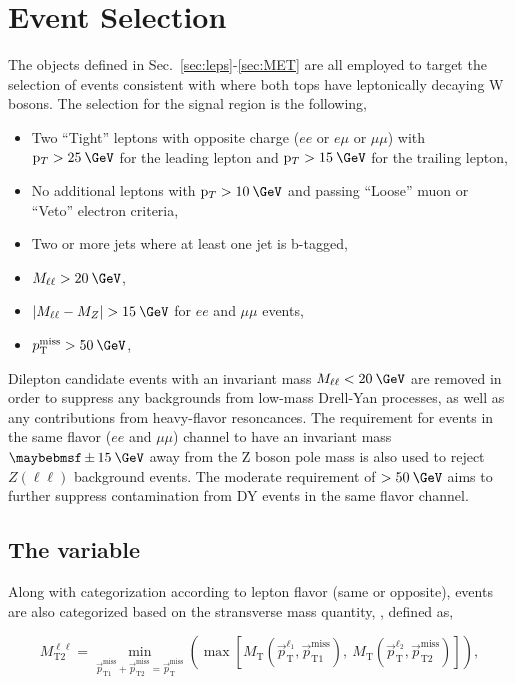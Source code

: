 \section{Event Selection}
\label{sec:selection}

The objects defined in Sec.~\ref{sec:leps}-\ref{sec:MET} are all employed to target the selection of events consistent with \ttMET where both tops have leptonically decaying W bosons. The selection for the signal region is the following,

\begin{itemize}
\item Two ``Tight'' leptons with opposite charge ($ee$ or $e\mu$ or $\mu\mu$) with $\pt>25\:\GeV$ for the leading lepton and $\pt>15\:\GeV$ for the trailing lepton,
\item No additional leptons with $\pt>10\:\GeV$ and passing ``Loose'' muon or ``Veto'' electron criteria,
\item Two or more jets where at least one jet is b-tagged,
\item $M_{\ell\ell}>20\:\GeV$,
\item $|M_{\ell\ell} - M_Z|>15\:\GeV$ for $ee$ and $\mu\mu$ events,
\item $\ptmiss>50\:\GeV$,
\end{itemize}

Dilepton candidate events with an invariant mass $M_{\ell\ell}<20\:\GeV$ are removed in order to suppress any backgrounds from low-mass Drell-Yan processes, as well as any contributions from heavy-flavor resoncances. The requirement for events in the same flavor ($ee$ and $\mu\mu$) channel to have an invariant mass $\pm15\:\GeV$ away from the Z boson pole mass is also used to reject $Z(\ell\ell)$ background events. The moderate requirement of \ptmiss$>50\:\GeV$ aims to further suppress contamination from DY events in the same flavor channel.

\subsection{The \mttll variable}
\label{subsec:mt2ll}
Along with categorization according to lepton flavor (same or opposite), events are also categorized based on the stransverse mass quantity, \mttll, defined as,

\begin{equation}
M_{\text{T2}}^{\ell\ell} = \min_{\vec{p}^{\text{miss}}_{\text{T1}}+\vec{p}^{\text{miss}}_{\text{T2}}=\vec{p}^{\text{miss}}_{\text{T}}}
\left(\max\left[M_{\text{T}}\left(\vec{p}^{\ell_1}_{\text{T}},\vec{p}^{\text{miss}}_{\text{T1}}\right),\:M_{\text{T}}\left(\vec{p}^{\ell_2}_{\text{T}},\vec{p}^{\text{miss}}_{\text{T2}}\right)\right]\right),
\label{eq:mt2ll}
\end{equation}

